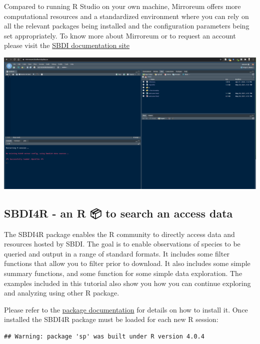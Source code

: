 \documentclass[
  10pt,
]{article}
\begin{document}
Compared to running R Studio on your own machine, Mirroreum offers more computational resources and a standardized environment where you can rely on all the relevant packages being installed and the configuration parameters being set appropriately. To know more about Mirroreum or to request an account please visit the \href{https://docs.biodiversitydata.se/analyse-data/mirroreum/}{SBDI documentation site}

\href{https://mirroreum.biodiversitydata.se/auth-sign-in}{\includegraphics{images/Mirroreum.png}}

\hypertarget{sbdi4r---an-r-to-search-an-access-data}{%
\subsection*{SBDI4R - an R 📦 to search an access data}\label{sbdi4r---an-r-to-search-an-access-data}}

The SBDI4R package enables the R community to directly access data and resources hosted by SBDI. The goal is to enable observations of species to be queried and output in a range of standard formats. It includes some filter functions that allow you to filter prior to download. It also includes some simple summary functions, and some function for some simple data exploration. The examples included in this tutorial also show you how you can continue exploring and analyzing using other R package.

Please refer to the \href{https://biodiversitydata-se.github.io/SBDI4R}{package documentation} for details on how to install it. Once installed the SBDI4R package must be loaded for each new R session:

\begin{verbatim}
## Warning: package 'sp' was built under R version 4.0.4
\end{verbatim}
\end{document}

